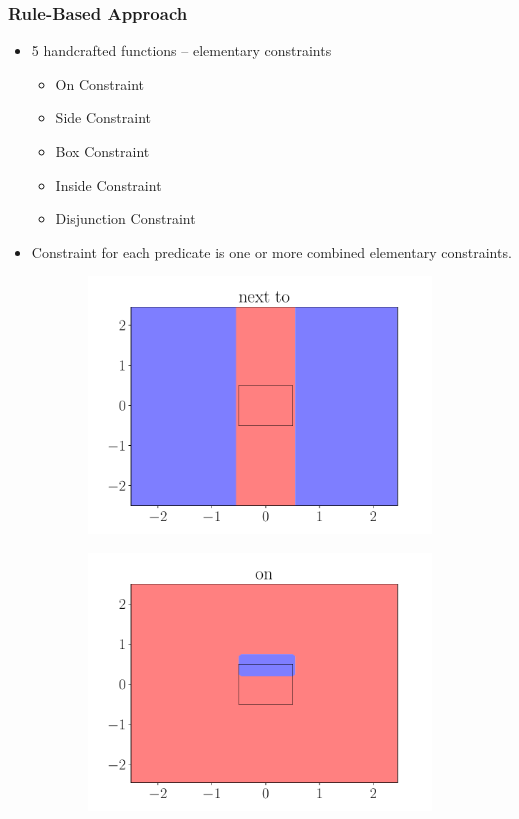 \documentclass{beamer}
\begin{document}
\begin{frame}
    \frametitle{Rule-Based Approach}
    \begin{itemize}
        \item 5 handcrafted functions -- elementary constraints
        \begin{itemize}
            \item On Constraint
            \item Side Constraint
            \item Box Constraint
            \item Inside Constraint
            \item Disjunction Constraint
        \end{itemize}
        \item Constraint for each predicate is one or more combined elementary constraints.
    \end{itemize}
    \begin{figure}[ht]
        \centering
        \begin{subfigure}{0.45\textwidth}
            \centering
            \includegraphics[width=\textwidth]{figures/next_to_rule}
        \end{subfigure}
        \begin{subfigure}{0.45\textwidth}
            \centering
            \includegraphics[width=\textwidth]{figures/on_rule}

\end{subfigure}
\end{figure}
\end{frame}
\end{document}
